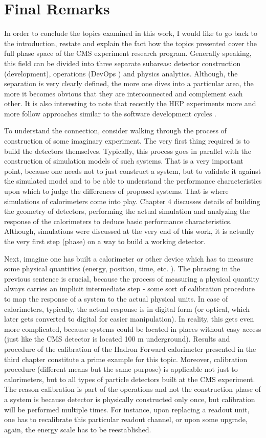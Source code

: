 \chapter{Final Remarks} \label{chapter:Remarks}
In order to conclude the topics examined in this work, I would like to go back to the introduction, restate and explain the fact how the topics presented cover the full phase space of the CMS experiment research program. Generally speaking, this field can be divided into three separate subareas: detector construction (development), operations (DevOps \cite{DevOps}) and physics analytics. Although, the separation is very clearly defined, the more one dives into a particular area, the more it becomes obvious that they are interconnected and complement each other. It is also interesting to note that recently the HEP experiments more and more follow approaches similar to the software development cycles \cite{SoftCycles}.

To understand the connection, consider walking through the process of construction of some imaginary experiment. The very first thing required is to build the detectors themselves. Typically, this process goes in parallel with the construction of simulation models of such systems. That is a very important point, because one needs not to just construct a system, but to validate it against the simulated model and to be able to understand the performance characteristics upon which to judge the differences of proposed systems. That is where simulations of calorimeters come into play. Chapter 4 discusses details of building the geometry of detectors, performing the actual simulation and analyzing the response of the calorimeters to deduce basic performance characteristics. Although, simulations were discussed at the very end of this work, it is actually the very first step (phase) on a way to build a working detector.

Next, imagine one has built a calorimeter or other device which has to measure some physical quantities (energy, position, time, etc. ). The phrasing in the previous sentence is crucial, because the process of measuring a physical quantity always carries an implicit intermediate step - some sort of calibration procedure to map the response of a system to the actual physical units. In case of calorimeters, typically, the actual response is in digital form (or optical, which later gets converted to digital for easier manipulation). In reality, this gets even more complicated, because systems could be located in places without easy access (just like the CMS detector is located 100 m underground). Results and procedure of the calibration of the Hadron Forward calorimeter presented in the third chapter constitute a prime example for this topic. Moreover, calibration procedure (different means but the same purpose) is applicable not just to calorimeters, but to all types of particle detectors built at the CMS experiment. The reason calibration is part of the operations and not the construction phase of a system is because detector is physically constructed only once, but calibration will be performed multiple times. For instance, upon replacing a readout unit, one has to recalibrate this particular readout channel, or upon some upgrade, again, the energy scale has to be reestablished.

